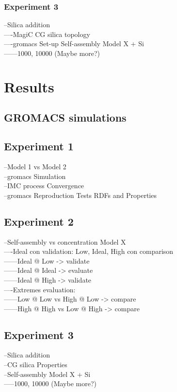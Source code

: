 \documentclass[10pt,a4paper,twoside]{article}
\begin{document}
\subsubsection*{Experiment 3}
 --Silica addition\\
  ----MagiC CG silica topology \\
  ----gromacs Set-up Self-assembly Model X + Si\\
   ------1000, 10000 (Maybe more?)
 
\section{Results}
\subsection{GROMACS simulations}
\subsection{Experiment 1}
 --Model 1 vs Model 2 \\
 --gromacs Simulation\\
 --IMC process Convergence\\
 --gromacs Reproduction Tests RDFs and Properties\\
\subsection{Experiment 2}
 --Self-assembly vs concentration Model X\\
  ----Ideal con validation: Low, Ideal, High con comparison\\
   ------Ideal @ Low -> validate\\
   ------Ideal @ Ideal -> evaluate\\
   ------Ideal @ High -> validate\\
  ----Extremes evaluation:\\
  ------Low @ Low vs High @ Low -> compare\\
   ------High @ High vs Low @ High -> compare\\
\label{subsec:resexp2}
\subsection{Experiment 3}
 --Silica addition\\
  --CG silica Properties \\
  --Self-assembly Model X + Si\\
   -----1000, 10000 (Maybe more?)\\
\end{document}
